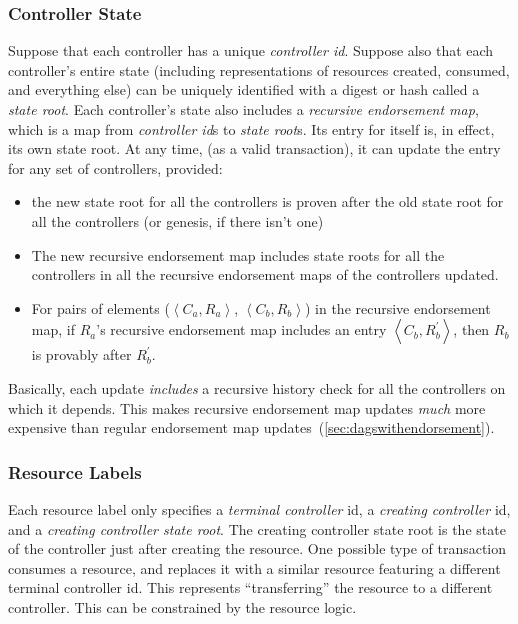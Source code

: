 \documentclass[a4paper,USenglish,cleveref, autoref, thm-restate, anonymous]{lipics-v2021}
\begin{document}
\subsubsection{Controller State}
Suppose that each controller has a unique \textit{controller id}.
Suppose also that each controller's entire state (including representations of resources created, consumed, and everything else) can be uniquely identified with a digest or hash called a \textit{state root}.
Each controller's state also includes a \textit{recursive endorsement map}, which is a map from \textit{controller id}s to \textit{state root}s.
Its entry for itself is, in effect, its own state root.
At any time, (as a valid transaction), it can update the entry for any set of controllers, provided:
\begin{itemize}
    \item the new state root for all the controllers is proven after the old state root for all the controllers (or genesis, if there isn't one)
    \item The new recursive endorsement map includes state roots for all the controllers in all the recursive endorsement maps of the controllers updated.
    \item For pairs of elements ($\left\langle C_a, R_a\right\rangle$, $\left\langle C_b, R_b\right\rangle$) in the recursive endorsement map, if $R_a$'s recursive endorsement map includes an entry $\left\langle C_b, R_b^\prime\right\rangle$, then $R_b$ is provably after $R_b^\prime$.
\end{itemize}
Basically, each update \textit{includes} a recursive history check for all the controllers on which it depends.
This makes recursive endorsement map updates \emph{much} more expensive than regular endorsement map updates~(\cref{sec:dagswithendorsement}).

\subsubsection{Resource Labels}
Each resource label only specifies a \textit{terminal controller} id, a \textit{creating controller} id, and a \textit{creating controller state root}.
The creating controller state root is the state of the controller just after creating  the resource.
One possible type of transaction consumes a resource, and replaces it with a similar resource featuring a different terminal controller id.
This represents ``transferring'' the resource to a different controller. 
This can be constrained by the resource logic. 
\end{document}
